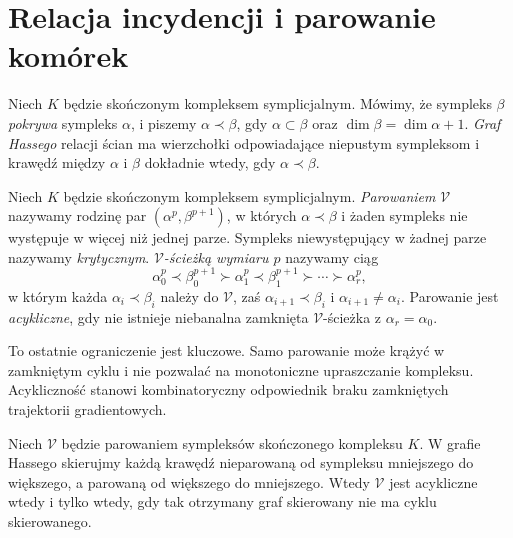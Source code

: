 \section{Relacja incydencji i parowanie komórek}
\label{sec:tg-forman-matching}

\begin{definicja}
Niech $K$ będzie skończonym kompleksem symplicjalnym.
Mówimy, że sympleks $\beta$ \emph{pokrywa} sympleks
$\alpha$, i piszemy $\alpha\prec\beta$, gdy
$\alpha\subset\beta$ oraz
$\dim\beta=\dim\alpha+1$. \emph{Graf Hassego}
relacji ścian ma wierzchołki odpowiadające niepustym
sympleksom i krawędź między $\alpha$ i $\beta$
dokładnie wtedy, gdy $\alpha\prec\beta$.
\end{definicja}

\begin{definicja}
\label{def:tg-discrete-morse-field}
Niech $K$ będzie skończonym kompleksem symplicjalnym.
\emph{Parowaniem} $\mathcal V$ nazywamy rodzinę par
$(\alpha^p,\beta^{p+1})$, w których
$\alpha\prec\beta$ i żaden sympleks nie występuje
w więcej niż jednej parze. Sympleks niewystępujący
w żadnej parze nazywamy \emph{krytycznym}.
\emph{$\mathcal V$-ścieżką wymiaru $p$} nazywamy ciąg
\[
\alpha_0^p\prec\beta_0^{p+1}\succ\alpha_1^p
\prec\beta_1^{p+1}\succ\cdots\succ\alpha_r^p,
\]
w którym każda $\alpha_i\prec\beta_i$ należy do
$\mathcal V$, zaś $\alpha_{i+1}\prec\beta_i$ i
$\alpha_{i+1}\ne\alpha_i$. Parowanie jest
\emph{acykliczne}, gdy nie istnieje niebanalna
zamknięta $\mathcal V$-ścieżka z
$\alpha_r=\alpha_0$.
\end{definicja}

To ostatnie ograniczenie jest kluczowe. Samo parowanie
może krążyć w zamkniętym cyklu i nie pozwalać na
monotoniczne upraszczanie kompleksu. Acykliczność
stanowi kombinatoryczny odpowiednik braku zamkniętych
trajektorii gradientowych.

\begin{stwierdzenie}
\label{thm:tg-morse-acyclic}
Niech $\mathcal V$ będzie parowaniem sympleksów
skończonego kompleksu $K$. W grafie Hassego skierujmy
każdą krawędź nieparowaną od sympleksu mniejszego do
większego, a parowaną od większego do mniejszego.
Wtedy $\mathcal V$ jest acykliczne wtedy i tylko wtedy,
gdy tak otrzymany graf skierowany nie ma cyklu skierowanego.
\end{stwierdzenie}

